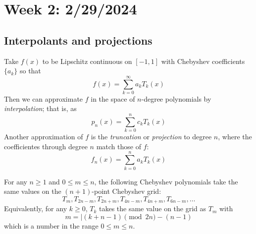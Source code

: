 \section{Week 2: 2/29/2024}
\subsection{Interpolants and projections}
Take $f(x)$ to be Lipschitz continuous on $[-1, 1]$ with Chebyshev coefficients $\{a_k\}$ so that
\[ f(x) = \displaystyle\sum_{k=0}^{\infty} a_kT_k(x) \]
Then we can approximate $f$ in the space of $n$-degree polynomials by \emph{interpolation}; that is, as
\[ p_n(x) = \displaystyle\sum_{k=0}^{n} c_kT_k(x) \]
Another approximation of $f$ is the \emph{truncation} or \emph{projection} to degree $n$, where the coefficientes through degree $n$ match those of $f$:
\begin{displaymath}
	f_n(x) = \displaystyle\sum_{k=0}^{n} a_kT_k(x)
\end{displaymath}

\begin{theorem}
	For any $n \geq 1$ and $0 \leq m \leq n$, the following Chebyshev polynomials take the same values on the $(n+1)$-point Chebyshev grid:
	\begin{displaymath}
		T_m, T_{2n-m}, T_{2n+m}, T_{4n-m}, T_{4n+m}, T_{6n-m}, \ldots
	\end{displaymath}
	Equivalently, for any $k \geq 0$, $T_k$ takes the same value on the grid as $T_m$ with
	\begin{displaymath}
		m = |(k+n-1)\pmod{2n} - (n-1)
	\end{displaymath}
	which is a number in the range $0 \leq m \leq n$.
\end{theorem}

